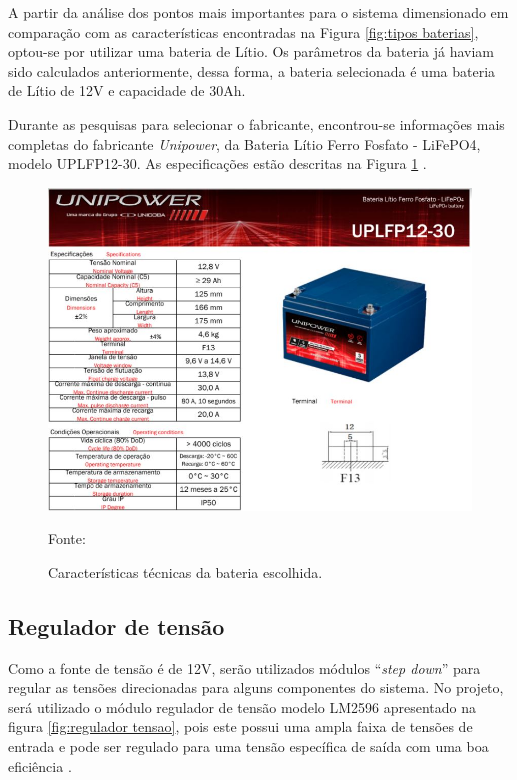 A partir da análise dos pontos mais importantes para o sistema dimensionado em comparação com as características encontradas na Figura \ref{fig:tipos baterias}, optou-se por utilizar uma bateria de Lítio. Os parâmetros da bateria já haviam sido calculados anteriormente, dessa forma, a bateria selecionada é uma bateria de Lítio de 12V e capacidade de 30Ah.

Durante as pesquisas para selecionar o fabricante, encontrou-se informações mais completas do fabricante \textit{Unipower}, da Bateria Lítio Ferro Fosfato - LiFePO4, modelo UPLFP12-30. As especificações estão descritas na Figura \ref{fig:caracteristica bateria} \cite{datasheet_bateria}.

\begin{figure}[!h]
	\centering
	\label{Características_bateria}
		\includegraphics[keepaspectratio=true,scale=0.6]{figuras/Caracteristicas_bateria.JPG}
	\caption{Características técnicas da bateria escolhida. }
	{\footnotesize Fonte: \cite{datasheet_bateria}}
	\label{fig:caracteristica bateria}
\end{figure}


\subsection{Regulador de tensão}

Como a fonte de tensão é de 12V, serão utilizados módulos “\textit{step down}” para regular as tensões direcionadas para alguns componentes do sistema. No projeto, será utilizado o módulo regulador de tensão modelo LM2596 apresentado na figura \ref{fig:regulador tensao}, pois este possui uma ampla faixa de tensões de entrada e pode ser regulado para uma tensão específica de saída com uma boa eficiência \cite{datasheet_regulador}.

